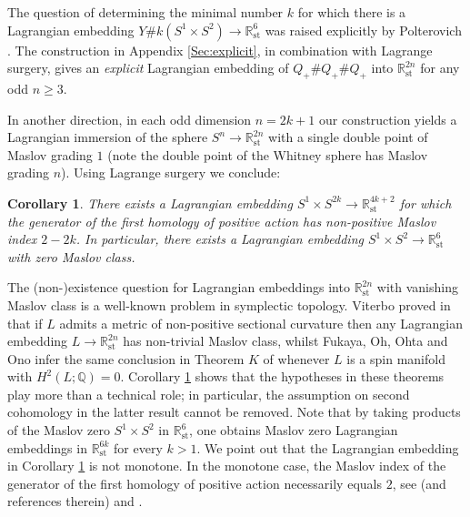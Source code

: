 \documentclass[reqno,11pt]{amsart}
\numberwithin{equation}{section}
\theoremstyle{my}
\theoremstyle{my}
\newtheorem{Corollary}[thm]{Corollary}
\theoremstyle{your}
\newcommand{\R}{\mathbb{R}}
\newcommand{\Q}{\mathbb{Q}}
\newcommand{\st}{\mathrm{st}}
\begin{document}
The question of determining the minimal number $k$ for which there is a Lagrangian embedding $Y \# k (S^1\times S^2) \rightarrow \R^6_\st$ was raised explicitly by Polterovich \cite[Remark 2]{Polterovich}.  The construction in Appendix \ref{Sec:explicit}, in combination with Lagrange surgery, gives an \emph{explicit} Lagrangian embedding of $Q_+ \# Q_+ \# Q_+$ into $\R^{2n}_{\st}$ for any odd $n\geq 3$.  

In another direction, in each odd dimension $n=2k+1$ our construction
yields  a Lagrangian immersion of the sphere $S^{n} \rightarrow \R^{2n}_{\st}$ with a single double point of Maslov grading $1$ (note the double point of the Whitney sphere has Maslov grading $n$). Using  Lagrange surgery we conclude:
\begin{Corollary}\label{cor:Maslov}
There exists a Lagrangian embedding $S^1 \times S^{2k} \rightarrow \R^{4k+2}_{\st}$ for which the generator of the first homology of positive action has non-positive  Maslov index $2-2k$. In particular, 
there exists a Lagrangian embedding $S^1 \times S^{2} \rightarrow \R^{6}_{\st}$ with zero Maslov class.
\end{Corollary}  

The (non-)existence question for  Lagrangian embeddings into $\R^{2n}_\st$ with vanishing Maslov class is a well-known problem in symplectic topology.  Viterbo proved in \cite{Viterbo} that if $L$ admits a metric of non-positive sectional curvature then any Lagrangian embedding $L \rightarrow \R^{2n}_{\st}$ has non-trivial Maslov class, whilst Fukaya, Oh, Ohta and Ono infer the same conclusion  in Theorem $K$ of  \cite{FOOO} whenever  $L$ is a spin manifold with $H^2(L;\Q)=0$. Corollary \ref{cor:Maslov} shows that the  hypotheses in these theorems play more than a technical role; in particular, the assumption  on second cohomology in the latter result cannot be removed. 
Note that by taking products of the Maslov zero $S^1\times S^2$ in $\R^6_{\st}$, one obtains Maslov zero Lagrangian embeddings in $\R^{6k}_{\st}$ for every $k> 1$. 
We point out that the Lagrangian embedding in Corollary \ref{cor:Maslov} is not monotone. In the monotone case, the Maslov index of the generator of the first homology of positive action necessarily equals $2$, see 
\cite[Proposition 2.10]{Fukaya} (and references therein) and \cite[Theorem 1.5 (b)]{Damian}.  
\end{document}
